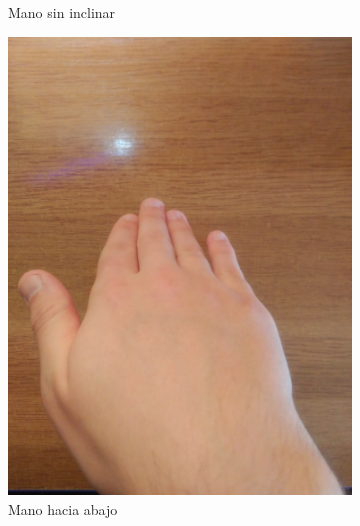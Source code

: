 \documentclass[a4paper,11pt]{article}
\begin{document}
\begin{figure}[!h]
\begin{subfigure}{0.32\textwidth}
		\caption{Mano sin inclinar}
	\end{subfigure}
	\begin{subfigure}{0.33\textwidth}
		\centering
		\includegraphics[scale=0.044]{./Imagenes/vista_desde_arriba.jpg}
		\caption{Mano hacia abajo}
	\end{subfigure}
	\begin{subfigure}{0.33\textwidth}
		\centering

\end{subfigure}
\end{figure}
\end{document}
